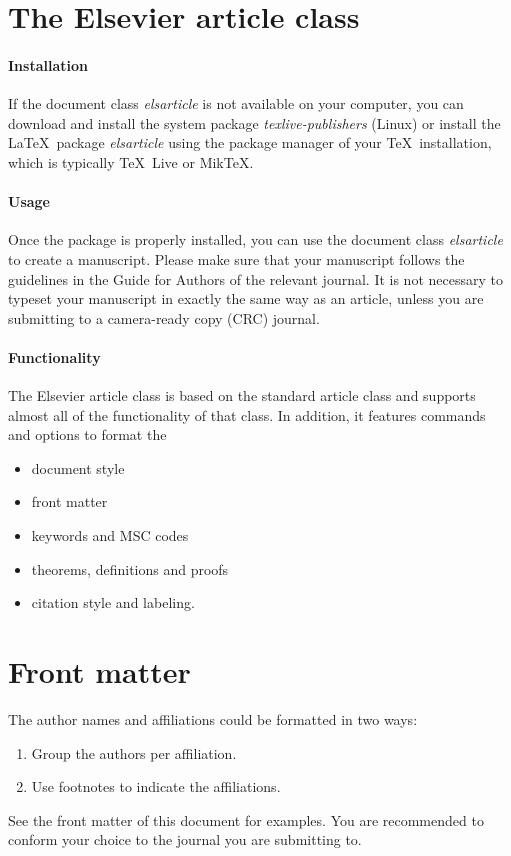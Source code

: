 
\section{The Elsevier article class}\label{sec:the-elsevier-article-class}

\paragraph{Installation} If the document class \emph{elsarticle} is not available on your computer, you can download and install the system package \emph{texlive-publishers} (Linux) or install the \LaTeX\ package \emph{elsarticle} using the package manager of your \TeX\ installation, which is typically \TeX\ Live or Mik\TeX.

\paragraph{Usage} Once the package is properly installed, you can use the document class \emph{elsarticle} to create a manuscript.
Please make sure that your manuscript follows the guidelines in the Guide for Authors of the relevant journal.
It is not necessary to typeset your manuscript in exactly the same way as an article, unless you are submitting to a camera-ready copy (CRC) journal.

\paragraph{Functionality} The Elsevier article class is based on the standard article class and supports almost all of the functionality of that class.
In addition, it features commands and options to format the
\begin{itemize}
\item document style
\item front matter
\item keywords and MSC codes
\item theorems, definitions and proofs
\item citation style and labeling.
\end{itemize}

\section{Front matter}\label{sec:front-matter}

The author names and affiliations could be formatted in two ways:
\begin{enumerate}[(1)]
\item Group the authors per affiliation.
\item Use footnotes to indicate the affiliations.
\end{enumerate}
See the front matter of this document for examples.
You are recommended to conform your choice to the journal you are submitting to.

